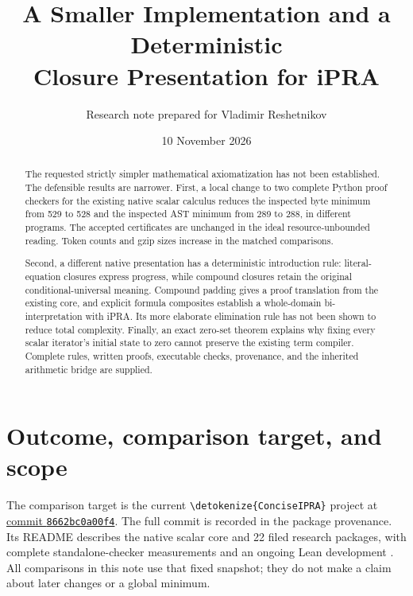 \documentclass[11pt,letterpaper]{article}
\title{\bfseries A Smaller Implementation and a Deterministic\\[4pt]
Closure Presentation for iPRA}
\author{Research note prepared for Vladimir Reshetnikov}
\date{10 November 2026}
\theoremstyle{definition}
\theoremstyle{remark}
\newcommand{\file}[1]{\expandafter\nolinkurl\expandafter{\detokenize{#1}}}
\begin{document}
\maketitle
\begin{abstract}
The requested strictly simpler mathematical axiomatization has not been
established. The defensible results are narrower. First, a local change to
two complete Python proof checkers for the existing native scalar calculus
reduces the inspected byte minimum from 529 to 528 and the inspected AST
minimum from 289 to 288, in different programs. The accepted certificates
are unchanged in the ideal resource-unbounded reading. Token counts and
gzip sizes increase in the matched comparisons.

Second, a different native presentation has a deterministic introduction
rule: literal-equation closures express progress, while compound closures
retain the original conditional-universal meaning. Compound padding gives
a proof translation from the existing core, and explicit formula composites
establish a whole-domain bi-interpretation with iPRA. Its more elaborate
elimination rule has not been shown to reduce total complexity. Finally, an
exact zero-set theorem explains why fixing every scalar iterator's initial
state to zero cannot preserve the existing term compiler. Complete rules,
written proofs, executable checks, provenance, and the inherited arithmetic
bridge are supplied.
\end{abstract}
\tableofcontents
\newpage

\section{Outcome, comparison target, and scope}

The comparison target is the current \file{ConciseIPRA} project at
\href{https://github.com/VladimirReshetnikov/ProveIt/tree/8662bc0a00f4e77e482f7d141d7a4f919f70f9aa/Logic/PrimitiveRecursiveArithmetic/ConciseIPRA}{commit \texttt{8662bc0a00f4}}.
The full commit is recorded in the package provenance. Its README describes
the native scalar core and 22 filed research packages, with complete
standalone-checker measurements and an ongoing Lean development
\cite{current}. All comparisons in this note use that fixed snapshot;
they do not make a claim about later changes or a global minimum.
\end{document}
